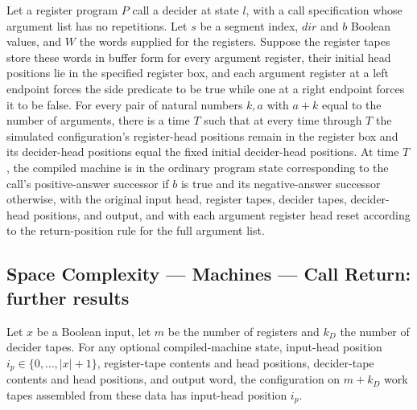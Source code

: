 \begin{lemma}
\label{Complexity.LogProg.regs_run}
\leanok
{}
Let a register program $P$ call a decider at state $l$, with a call specification whose
argument list has no repetitions. Let $s$ be a segment index, $dir$ and $b$ Boolean
values, and $W$ the words supplied for the registers. Suppose the register tapes store
these words in buffer form for every argument register, their initial head positions lie
in the specified register box, and each argument register at a left endpoint forces the
side predicate to be true while one at a right endpoint forces it to be false. For every
pair of natural numbers $k,a$ with $a+k$ equal to the number of arguments, there is a
time $T$ such that at every time through $T$ the simulated configuration's register-head
positions remain in the register box and its decider-head positions equal the fixed
initial decider-head positions. At time $T$, the compiled machine is in the ordinary
program state corresponding to the call's positive-answer successor if $b$ is true and
its negative-answer successor otherwise, with the original input head, register tapes,
decider tapes, decider-head positions, and output, and with each argument register head
reset according to the return-position rule for the full argument list.
\end{lemma}

\subsection*{Space Complexity --- Machines --- Call Return: further results}

\begin{lemma}
\label{Complexity.LogProg.mkCfg_inputPos}
\leanok
{}
Let $x$ be a Boolean input, let $m$ be the number of registers and $k_D$ the number of
decider tapes. For any optional compiled-machine state, input-head position
$i_p\in\{0,\dots,|x|+1\}$, register-tape contents and head positions, decider-tape
contents and head positions, and output word, the configuration on $m+k_D$ work tapes
assembled from these data has input-head position $i_p$.
\end{lemma}

